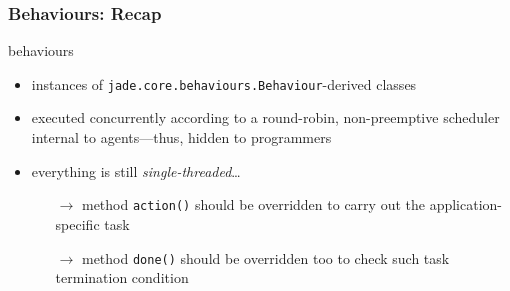 \documentclass{beamer}\mode<presentation>{\usetheme{AMSCesenaPurpleAndGold}}
\begin{document}
\begin{frame}\frametitle{\jade{} Behaviours: Recap}
    \begin{block}{\jade{} behaviours}
        \begin{itemize}
            \item instances of \alert{\texttt{jade.core.behaviours.Behaviour}}-derived classes
            \item executed concurrently according to a \alert{round-robin, non-preemptive} scheduler internal to agents---thus, hidden to programmers
            \item everything is still \emph{single-threaded}\ldots
            \begin{itemize}
                \item[$\rightarrow$] method \alert{\texttt{action()}} should be overridden to carry out the application-specific task
                \item[$\rightarrow$] method \alert{\texttt{done()}} should be overridden too to check such task termination condition
            \end{itemize}
        \end{itemize}
    \end{block}
\end{frame}
\end{document}
